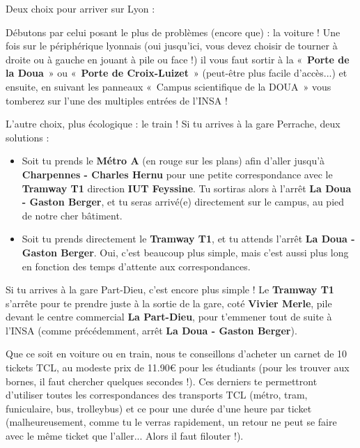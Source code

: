 Deux choix pour arriver sur Lyon :

\vspace{1em}

Débutons par celui posant le plus de problèmes (encore que) : la voiture !
Une fois sur le périphérique lyonnais (oui jusqu'ici, vous devez choisir de tourner à droite ou à gauche en jouant à pile ou face !)
il vous faut sortir à la «~\textbf{Porte de la Doua}~» ou «~\textbf{Porte de
    Croix-Luizet}~» (peut-être plus facile d'accès...)
et ensuite, en suivant les panneaux «~Campus scientifique de la DOUA~»
vous tomberez sur l'une des multiples entrées de l'INSA !

\vspace{1em}

L'autre choix, plus écologique : le train !
Si tu arrives à la gare Perrache, deux solutions :
\begin{itemize}
    \item Soit tu prends le \textbf{Métro A} (en rouge sur les plans) afin
    d'aller jusqu'à \textbf{Charpennes - Charles Hernu} pour une
    petite correspondance avec le \textbf{Tramway T1} direction
    \textbf{IUT Feyssine}. Tu sortiras alors à l'arrêt
    \textbf{La Doua - Gaston Berger}, et tu seras arrivé(e) directement sur le campus, au pied de notre cher bâtiment.

    \item Soit tu prends directement le \textbf{Tramway T1}, et tu
    attends l'arrêt \textbf{La Doua - Gaston Berger}. Oui, c'est
    beaucoup plus simple, mais c'est aussi plus long en fonction des
    temps d'attente aux correspondances.
\end{itemize}

\vspace{1em}

Si tu arrives à la gare Part-Dieu, c'est encore plus simple ! Le
\textbf{Tramway T1} s'arrête pour te prendre juste à la sortie de la gare,
coté \textbf{Vivier Merle}, pile devant le centre commercial \textbf{La Part-Dieu}, pour
t'emmener tout de suite à l'INSA (comme précédemment, arrêt \textbf{La Doua - Gaston Berger}).

\vspace{1em}

Que ce soit en voiture ou en train, nous te conseillons d'acheter un carnet de
10 tickets TCL, au modeste prix de 11.90€ pour les étudiants (pour
les trouver aux bornes, il faut chercher quelques secondes !). Ces derniers te
permettront d'utiliser toutes les correspondances des transports TCL (métro,
tram, funiculaire, bus, trolleybus) et ce pour une durée d'une heure par ticket 
(malheureusement, comme tu le verras rapidement, un retour ne peut se faire
avec le même ticket que l'aller... Alors il faut filouter !).

